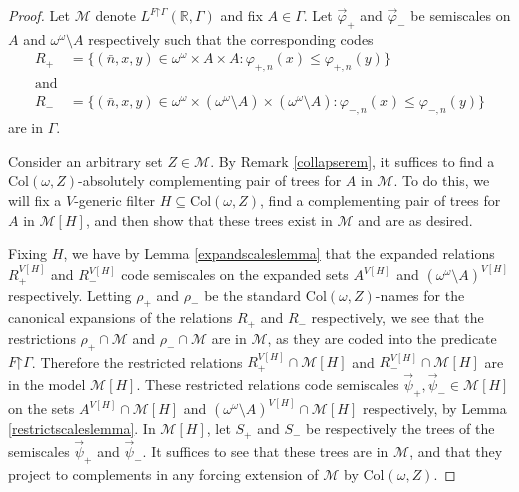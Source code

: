 \documentclass[fleqn, 11pt]{amsart}
\theoremstyle{plain}
\theoremstyle{definition}
\theoremstyle{remark}
\newcommand{\uB}{\mathrm{uB}}
\newcommand{\Col}{\mathrm{Col}}
\newcommand{\restrict}{\mathord{\restriction}}
\DeclareMathOperator{\p}{p}
\begin{document}
\begin{proof}
	Let $\mathcal{M}$ denote $L^{F \restrict \Gamma}(\mathbb{R}, \Gamma)$ and fix $A \in \Gamma$. 
	Let $\vec{\varphi}_+$ and $\vec{\varphi}_-$ be semiscales on $A$ and $\omega^\omega \setminus A$ respectively
	such that the corresponding codes
	\begin{align*}
		R_+ &= \{ (\bar{n}, x, y) \in \omega^{\omega} \times A \times A : \varphi_{+,n}(x) \le \varphi_{+,n}(y) \}\\
		\text{and}\\
		R_- &= \{ (\bar{n}, x, y) \in \omega^{\omega} \times (\omega^\omega \setminus A) \times (\omega^\omega \setminus A) : \varphi_{-,n}(x) \le \varphi_{-,n}(y) \}
	\end{align*}
	are in $\Gamma$. 
	
	Consider an arbitrary set $Z \in \mathcal{M}$.  By Remark \ref{collapserem}, it suffices to find a $\Col(\omega,Z)$-absolutely complementing pair of trees for $A$ in $\mathcal{M}$.
	To do this, we will fix a $V$-generic filter $H \subseteq \Col(\omega,Z)$, find a complementing pair of trees for $A$ in $\mathcal{M}[H]$, and then show that these trees exist in $\mathcal{M}$ and are as desired. 
	
	Fixing $H$, we have by Lemma \ref{expandscaleslemma} that
	the expanded relations $R_+^{V[H]}$ and $R_-^{V[H]}$ code semiscales on the expanded sets $A^{V[H]}$ and $(\omega^\omega \setminus A)^{V[H]}$ respectively.
	Letting $\rho_+$ and $\rho_-$ be the standard $\Col(\omega,Z)$-names for the canonical expansions of the relations $R_+$ and $R_-$ respectively, we see that the restrictions $\rho_+ \cap \mathcal{M}$ and $\rho_- \cap \mathcal{M}$ are in $\mathcal{M}$, as they are coded into the predicate $F \restrict \Gamma$. Therefore the restricted relations $R_+^{V[H]} \cap {\mathcal{M}[H]}$ and $R_-^{V[H]} \cap {\mathcal{M}[H]}$ are in the model $\mathcal{M}[H]$. These restricted relations code semiscales $\vec{\psi}_+,\vec{\psi}_- \in \mathcal{M}[H]$ on the sets $A^{V[H]} \cap {\mathcal{M}[H]}$ and $(\omega^\omega \setminus A)^{V[H]} \cap {\mathcal{M}[H]}$ respectively, 
	by Lemma \ref{restrictscaleslemma}. 
	In $\mathcal{M}[H]$, let $S_+$ and $S_-$ be respectively the trees of the semiscales $\vec{\psi}_{+}$ and $\vec{\psi}_{-}$. It suffices to see that these trees are in $\mathcal{M}$, and that they project to complements in any forcing extension of $\mathcal{M}$ by $\Col(\omega, Z)$. 
	

\end{proof}
\end{document}
